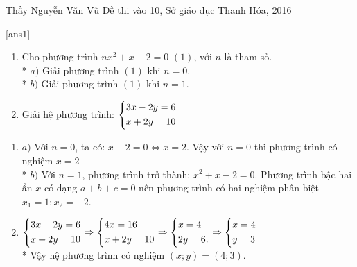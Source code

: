 \begin{name}
{Thầy  Nguyễn Văn Vũ}
{Đề thi vào 10, Sở giáo dục Thanh Hóa, 2016}
\end{name}
\setcounter{ex}{0}
[ans1]
\begin{ex}%
    \hfill
    \begin{enumerate}
        \item Cho phương trình $nx^{2}+x-2=0$  $(1)$, với $n$ là tham số.\\*
        $a)$ Giải phương trình $(1)$ khi $n=0$.\\*
        $b)$ Giải phương trình $(1)$ khi $n=1$.
        \item Giải hệ phương trình: $\left\{\begin{aligned}&3x-2y=6\\&x+2y=10\end{aligned}\right.$
    \end{enumerate}
\loigiai
    {
    \begin{enumerate}
        \item $a)$ Với $n=0$, ta có: $x-2=0\Leftrightarrow x=2.$ Vậy với $n=0$ thì phương trình có nghiệm $x=2$ \\*
              $b)$ Với $n=1$, phương trình trở thành: $x^{2}+x-2=0.$ Phương trình bậc hai ẩn $x$ có dạng $a+b+c=0$ nên phương trình có hai nghiệm phân biệt $x_{1}=1;x_{2}=-2$.
        \item $\left\{\begin{aligned}&3x-2y=6\\&x+2y=10\end{aligned}\right.\Rightarrow \left\{\begin{aligned}& 4x=16\\ & x+2y=10\end{aligned}\right.\Rightarrow\left\{\begin{aligned}& x=4\\ & 2y=6.\end{aligned}\right.\Rightarrow \left\{\begin{aligned}&x=4\\ &y=3\end{aligned}\right.$\\*
             Vậy hệ phương trình có nghiệm $(x;y)=(4;3)$.
    \end{enumerate}
    }
\end{ex}

